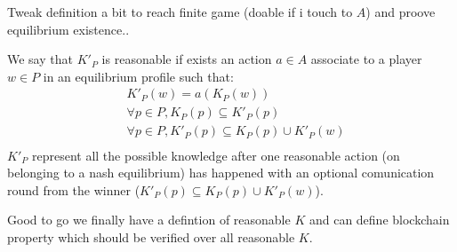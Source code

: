 Tweak definition a bit to reach finite game (doable if i touch to $A$) and proove equilibrium existence..

\begin{mydef}
	We say that $K'_P$ is reasonable if exists an action $a \in A$ associate to a player $w \in P$ in an equilibrium profile such that: 	\begin{eqnarray*}	
		& K'_P(w) = a(K_P(w)) \\
		&\forall p \in P, K_P(p) \subseteq K'_P(p) \\
		&\forall p \in P, K'_P(p) \subseteq K_P(p) \cup K'_P(w) \\
	\end{eqnarray*}	
	$K'_P$ represent all the possible knowledge after one reasonable action (on belonging to a nash equilibrium) has happened with an optional comunication round from the winner ($K'_P(p) \subseteq K_P(p) \cup K'_P(w)$). 
\end{mydef}

Good to go we finally have a defintion of reasonable $K$ and can define blockchain property which should be verified over all reasonable $K$.
